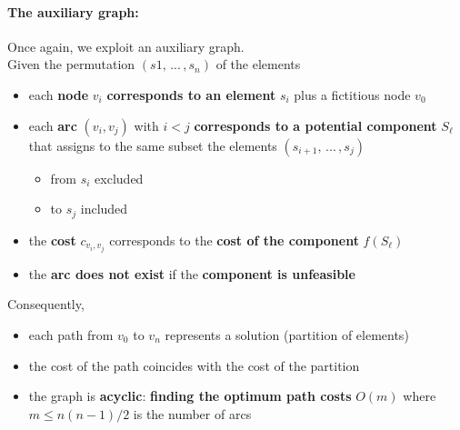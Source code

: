 \paragraph{The auxiliary graph:} Once again, we exploit an auxiliary graph. \\
Given the permutation $(s1, \, ... \, , s_n)$ of the elements
\begin{itemize}
	\item each \textbf{node} $v_i$ \textbf{corresponds to an element} $s_i$ plus a fictitious node $v_0$
	
	\item each \textbf{arc} $(v_i , v_j )$ with $i < j$ \textbf{corresponds to a potential component} $S_{\ell}$ that assigns to the same subset the elements $(s_{i+1}, \, ... \, , s_j)$
	\begin{itemize}
		\item from $s_i$ excluded
		\item to $s_j$ included
	\end{itemize}
	
	\item the \textbf{cost} $c_{v_i ,v_j}$ corresponds to the \textbf{cost of the component} $f (S_{\ell})$
	
	\item the \textbf{arc does not exist} if the \textbf{component is unfeasible}
\end{itemize}

Consequently,
\begin{itemize}
	\item each path from $v_0$ to $v_n$ represents a solution (partition of elements)
	
	\item the cost of the path coincides with the cost of the partition
	
	\item the graph is \textbf{acyclic}: \textbf{finding the optimum path costs} $O (m)$ where $m \le n (n − 1) /2$ is the number of arcs
\end{itemize}

\newpage

